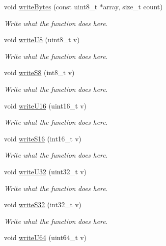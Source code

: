 \begin{DoxyCompactItemize}
\item 
void \hyperlink{classWriter_ad8e295a99558edd8eeaf96ef56d6ab53}{write\+Bytes} (const uint8\+\_\+t $\ast$array, size\+\_\+t count)
\begin{DoxyCompactList}\small\item\em Write what the function does here. \end{DoxyCompactList}\item 
void \hyperlink{classWriter_a93d7ccb31453ec0f76ffe73b0ba6bb1b}{write\+U8} (uint8\+\_\+t v)
\begin{DoxyCompactList}\small\item\em Write what the function does here. \end{DoxyCompactList}\item 
void \hyperlink{classWriter_a26928e208d620cb69e8b1bbdce5f672b}{write\+S8} (int8\+\_\+t v)
\begin{DoxyCompactList}\small\item\em Write what the function does here. \end{DoxyCompactList}\item 
void \hyperlink{classWriter_a87898dff934c55c144149029173fe66f}{write\+U16} (uint16\+\_\+t v)
\begin{DoxyCompactList}\small\item\em Write what the function does here. \end{DoxyCompactList}\item 
void \hyperlink{classWriter_a8f83ddf72875fa45c2db077975717c02}{write\+S16} (int16\+\_\+t v)
\begin{DoxyCompactList}\small\item\em Write what the function does here. \end{DoxyCompactList}\item 
void \hyperlink{classWriter_ab8ed28096897dc429c95290542389224}{write\+U32} (uint32\+\_\+t v)
\begin{DoxyCompactList}\small\item\em Write what the function does here. \end{DoxyCompactList}\item 
void \hyperlink{classWriter_a6692f1d2ffa76a9acd3101af9fcdae23}{write\+S32} (int32\+\_\+t v)
\begin{DoxyCompactList}\small\item\em Write what the function does here. \end{DoxyCompactList}\item 
void \hyperlink{classWriter_aa2196ac25657790ad45fcd20e6fd8a3d}{write\+U64} (uint64\+\_\+t v)

\end{DoxyCompactItemize}
